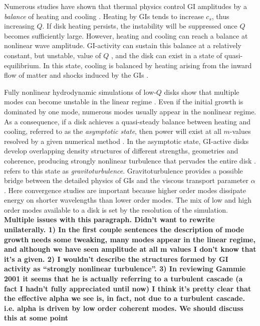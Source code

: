 \documentclass[manuscript]{aastex}
\begin{document}
Numerous studies have shown that thermal physics control GI amplitudes by a {\it balance} of heating and cooling \citep[e.g.,][]{tomley1991,tomley1994,pickett1998,pickett2000, pickett2003,gammie2001,boss2002,rice2003b,mejia2005,boley2006,boley2007, stamatellos2008,cossins2009}.
Heating by GIs tends to increase $c_s$, thus increasing $Q$. If disk heating persists, the instability will be suppressed once $Q$ becomes sufficiently large.  However, heating and cooling can reach a balance at nonlinear wave amplitude. GI-activity can sustain this balance  at a relatively constant,
but unstable, value of $Q$ \citep{paczynski1978, lin1981,goldreich1965}, and 
the disk can exist in a state of quasi-equilibrium. In this state, cooling is 
balanced by heating arising from the inward flow of matter and shocks induced by the GIs
\citep{gammie2001, lodato2004, rice2005, boley2006, cossins2009, vorobyov2010}.

Fully nonlinear hydrodynamic simulations of low-$Q$ disks show that multiple
modes can become unstable in the linear regime \citep{nelson1998, pickett1998, lodato2004,boley2006,cossins2009}.  Even if the initial growth is dominated by one mode, numerous modes usually appear in the nonlinear regime. As a consequence, if a disk achieves a quasi-steady balance between heating and cooling, referred to as the {\it asymptotic state},
then power will exist at all $m$-values resolved by a given numerical method \citep{mejia2005,boley2006}.  
In the asymptotic state, GI-active disks develop overlapping density structures of different strengths, geometries and coherence, producing strongly nonlinear turbulence that pervades the entire disk \citep[e.g.][]{pickett2003, mejia2005,boley2006}.
\citet{gammie2001} refers to this state as {\it gravitoturbulence}. Gravitoturbulence provides a possible bridge between the detailed physics of GIs and the viscous transport parameter $\alpha$.  Here convergence studies are important because 
higher order modes dissipate energy on shorter wavelengths than lower order modes.  The mix of low and high order modes available to a disk is set by the resolution of the simulation. {\bf Multiple issues with this paragraph. Didn't want to rewrite unilaterally. 1) In the first couple sentences the description of mode growth needs some tweaking, many modes appear in the linear regime, and although we have seen amplitude at all m values I don't know that it's a given. 2) I wouldn't describe the structures formed by GI activity as ``strongly nonlinear turbulence''. 3) In reviewing Gammie 2001 it seems that he is actually referring to a turbulent cascade (a fact I hadn't fully appreciated until now) I think it's pretty clear that the effective alpha we see is, in fact, not due to a turbulent cascade. i.e. alpha is driven by low order coherent modes. We should discuss this at some point}
\end{document}
